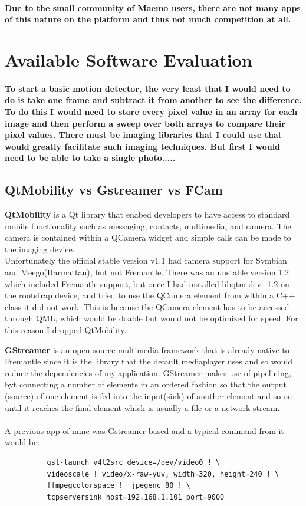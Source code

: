 \paragraph{Due to the small community of Maemo users, there are not many apps of this nature on the platform and thus not much competition at all.}

\section{Available Software Evaluation}
\paragraph{To start a basic motion detector, the very least that I would need to do is take one frame and subtract it from another to see the difference. To do this I would need to store every pixel value in an array for each image and then perform a sweep over both arrays to compare their pixel values. There must be imaging libraries that I could use that would greatly facilitate such imaging techniques. But first I would need to be able to take a single photo.....}

\subsection{QtMobility vs Gstreamer vs FCam}

{\bf QtMobility} is a Qt library that enabed developers to have access to standard mobile functionality such as messaging, contacts, multimedia, and camera.  The camera is contained within a QCamera widget and simple calls can be made to the imaging device.
\\Unfortunately the official stable version v1.1 had camera support for Symbian and Meego(Harmattan), but not Fremantle. There was an unstable version 1.2 which included Fremantle support, but once I had installed libqtm-dev\_1.2 on the rootstrap device, and tried to use the QCamera element from within a C++ class it did not work. This is because the QCamera element has to be accessed through QML, which would be doable but would not be optimized for speed. For this reason I dropped QtMobility.

{\bf GStreamer} is an open source multimedia framework that is already native to Fremantle since it is the library that the default mediaplayer uses and so would reduce the dependencies of my application. GStreamer makes use of pipelining, byt connecting a number of elements in an ordered fashion so that the output (source) of one element is fed into the input(sink) of another element and so on until it reaches the final element which is usually a file or a network stream.
\\\\A previous app of mine was Gstreamer based and a typical command from it would be:
\label{gstreamer}
\begin{verbatim}
	      gst-launch v4l2src device=/dev/video0 ! \
	      videoscale ! video/x-raw-yuv, width=320, height=240 ! \
	      ffmpegcolorspace !  jpegenc 80 ! \
	      tcpserversink host=192.168.1.101 port=9000
\end{verbatim}

